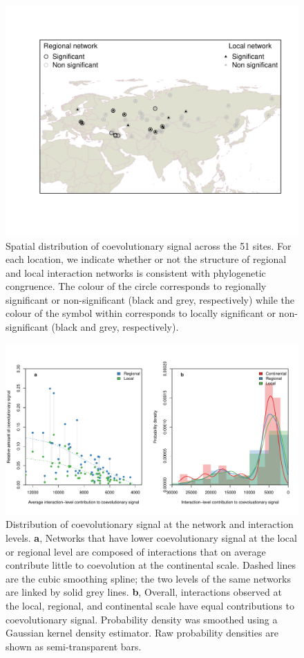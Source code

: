 \documentclass[12pt]{article}
\begin{document}
\clearpage
\listoffigures
\clearpage
\begin{figure}[p!]
  \centering
  \includegraphics[width=\textwidth]{../figures/figure1.pdf}
	\caption[Spatial distribution.]{Spatial distribution of coevolutionary signal across the 51 sites. For
each location, we indicate whether or not the structure of regional and
local interaction networks is consistent with phylogenetic congruence.
The colour of the circle corresponds to regionally significant or
non-significant (black and grey, respectively) while the colour of the
symbol within corresponds to locally significant or non-significant
(black and grey, respectively).}
	\label{maps}
\end{figure}
\cleardoublepage
\begin{figure}[p!]
  \centering
  \includegraphics[width=\textwidth]{../figures/figure4.pdf}
	\caption[Example figure.]{Distribution of coevolutionary signal at the network and interaction
levels. \textbf{a}, Networks that have lower coevolutionary signal at
the local or regional level are composed of interactions that on average
contribute little to coevolution at the continental scale. Dashed lines
are the cubic smoothing spline; the two levels of the same networks are
linked by solid grey lines. \textbf{b}, Overall, interactions observed
at the local, regional, and continental scale have equal contributions
to coevolutionary signal. Probability density was smoothed using a
Gaussian kernel density estimator. Raw probability densities are shown
as semi-transparent bars.}
	\label{contributions}
\end{figure}
\end{document}

